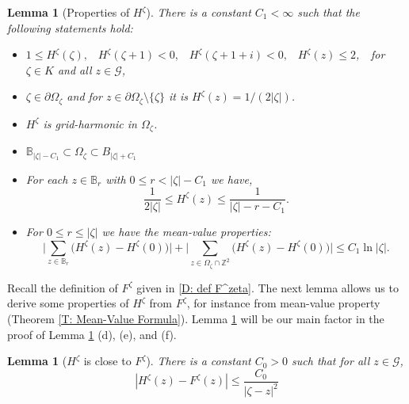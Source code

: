 \documentclass[11pt]{article}
\numberwithin{equation}{section}
\def\OZ{\Omega_{\zeta}}
\newtheorem{lemma}[theorem]{Lemma}
\begin{document}
\begin{lemma}[Properties of $H^{\zeta}$]
  \label{Properties of H}
  There is a constant $C_1 < \infty$ 
  such that the following statements hold: 
  \begin{itemize}
    \item[(a)]   $ 1 \leq H^{\zeta}(\zeta), \;\;\;
      H^{\zeta}(\zeta + 1) < 0,  \;\;\;
      H^{\zeta}(\zeta+1+i) < 0, \;\;\; 
      H^{\zeta}(z) \leq 2$, \,\, for $\zeta \in K$ and all $z \in \mathcal{G}$, 

    \item[(b)] 
      $\zeta \in \partial \OZ$ and for 
      $z \in \partial \OZ \setminus \{ \zeta \}$ 
      it is $H^{\zeta}(z) = 1/(2 |\zeta|)$.

    \item[(c)] 
      $H^{\zeta}$ is grid-harmonic in $\OZ$. 

    \item[(d)] 
      $\mathbb{B}_{|\zeta|-C_1} \subset 
      \OZ \subset B_{|\zeta| + C_1}$

    \item[(e)] 
      For each $z \in \mathbb{B}_r$ with  $0\leq r < |\zeta| -C_1$ we have, 
      \begin{equation}\nonumber
        \frac{1}{2|\zeta|} \leq H^{\zeta}(z) 
          \leq \frac{1}{|\zeta| - r -C_1}.
      \end{equation}

    \item[(f)] For $0 \leq r \leq |\zeta|$ 
      we have the mean-value properties:  
      \begin{equation}\nonumber
        \bigg| \sum_{z \in \mathbb{B}_r} 
            \big( H^{\zeta}(z) -H^{\zeta}(0) \big) \bigg| 
          + \bigg| \sum_{z \in \OZ \cap \mathbb{Z}^2} 
              \big( H^{\zeta}(z) - H^{\zeta}(0) \big) \bigg|
        \leq C_1 \ln |\zeta|.
      \end{equation}
  \end{itemize}
\end{lemma}

Recall the definition of $F^{\zeta}$ given in \eqref{D: def F^zeta}. 
The next lemma allows us to derive some properties of $H^{\zeta}$ 
from $F^{\zeta}$, for instance from mean-value property (Theorem \ref{T: Mean-Value Formula}).
Lemma \ref{L: H close to F} will be our main factor in 
the proof of Lemma \ref{Properties of H} (d), (e), and (f).

\begin{lemma}[$H^{\zeta}$ is close to $F^{\zeta}$]
  \label{L: H close to F} 
  There is a constant $C_0 > 0$ such that for all $z \in \mathcal{G}$, 
  \begin{equation}
    \nonumber
    |H^{\zeta}(z) - F^{\zeta}(z)| 
      \leq \frac{C_0}{|\zeta - z|^2}
  \end{equation}
\end{lemma}
\end{document}
